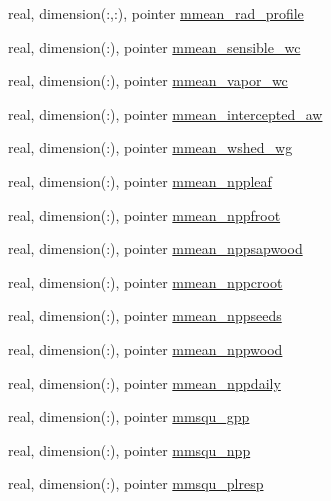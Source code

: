 \begin{DoxyCompactItemize}
\item 
real, dimension(\+:,\+:), pointer \hyperlink{structed__state__vars_1_1patchtype_ac7d96fddb4fda99dd0071452e32fee80}{mmean\+\_\+rad\+\_\+profile}
\item 
real, dimension(\+:), pointer \hyperlink{structed__state__vars_1_1patchtype_ae8332399009ac9be66ca592cc8b53e50}{mmean\+\_\+sensible\+\_\+wc}
\item 
real, dimension(\+:), pointer \hyperlink{structed__state__vars_1_1patchtype_a7ed35ef2c6e0ab12d4dd4ed39c9e9dfa}{mmean\+\_\+vapor\+\_\+wc}
\item 
real, dimension(\+:), pointer \hyperlink{structed__state__vars_1_1patchtype_a9dbd2781ff3c6fe5680d37fd2f0e156b}{mmean\+\_\+intercepted\+\_\+aw}
\item 
real, dimension(\+:), pointer \hyperlink{structed__state__vars_1_1patchtype_a87f17bd51c3b7e18f2f3d17a623603b5}{mmean\+\_\+wshed\+\_\+wg}
\item 
real, dimension(\+:), pointer \hyperlink{structed__state__vars_1_1patchtype_a4d821fed951f48131a813464aec0cc1f}{mmean\+\_\+nppleaf}
\item 
real, dimension(\+:), pointer \hyperlink{structed__state__vars_1_1patchtype_a78eb712fc376e54b472322b97a492a55}{mmean\+\_\+nppfroot}
\item 
real, dimension(\+:), pointer \hyperlink{structed__state__vars_1_1patchtype_aa9035aa4b670643bc414fed3017b56fa}{mmean\+\_\+nppsapwood}
\item 
real, dimension(\+:), pointer \hyperlink{structed__state__vars_1_1patchtype_a208f1891b3070ce8d4d5201d7a1ba175}{mmean\+\_\+nppcroot}
\item 
real, dimension(\+:), pointer \hyperlink{structed__state__vars_1_1patchtype_acf5fa7ff630077884dbf84e1a8b6df86}{mmean\+\_\+nppseeds}
\item 
real, dimension(\+:), pointer \hyperlink{structed__state__vars_1_1patchtype_af69c95f5c0653301cb70edda68c5b208}{mmean\+\_\+nppwood}
\item 
real, dimension(\+:), pointer \hyperlink{structed__state__vars_1_1patchtype_a1a36c44819f2dbda5d80097a814121f5}{mmean\+\_\+nppdaily}
\item 
real, dimension(\+:), pointer \hyperlink{structed__state__vars_1_1patchtype_a608b449270ffa93392ff010e5760fb70}{mmsqu\+\_\+gpp}
\item 
real, dimension(\+:), pointer \hyperlink{structed__state__vars_1_1patchtype_a4053831b3508f65d8e7393353ad0da19}{mmsqu\+\_\+npp}
\item 
real, dimension(\+:), pointer \hyperlink{structed__state__vars_1_1patchtype_a36b9d9ccd022e95745e02b9b241fb3b8}{mmsqu\+\_\+plresp}

\end{DoxyCompactItemize}

